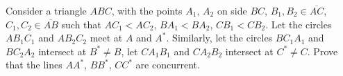 Consider a triangle $ABC$, with the points $A_1$, $A_2$ on side $BC$, $B_1,B_2\in\overline{AC}$, $C_1,C_2\in\overline{AB}$ such that $AC_1<AC_2$, $BA_1<BA_2$, $CB_1<CB_2$. Let the circles $AB_1C_1$ and $AB_2C_2$ meet at $A$ and $A^*$. Similarly, let the circles $BC_1A_1$ and $BC_2A_2$ intersect at $B^*\neq B$, let $CA_1B_1$ and $CA_2B_2$ intersect at $C^*\neq C$. Prove that the lines $AA^*$, $BB^*$, $CC^*$ are concurrent.